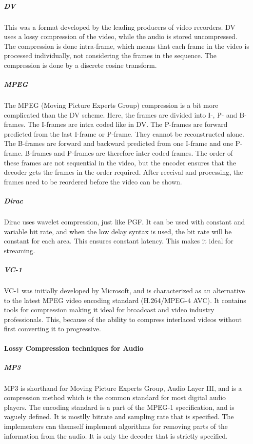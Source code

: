 \subparagraph{DV}
This was a format developed by the leading producers of video recorders. DV uses a lossy compression of the video, while the audio is stored uncompressed. The compression is done intra-frame, which means that each frame in the video is processed individually, not considering the frames in the sequence. The compression is done by a discrete cosine transform.
\cite{bib:DV}


\subparagraph{MPEG}
The MPEG (Moving Picture Experts Group) compression is a bit more complicated than the DV scheme. Here, the frames are divided into I-, P- and B-frames. The I-frames are intra coded like in DV. The P-frames are forward predicted from the last I-frame or P-frame. They cannot be reconstructed alone. The B-frames are forward and backward predicted from one I-frame and one P-frame. B-frames and P-frames are therefore inter coded frames. The order of these frames are not sequential in the video, but the encoder ensures that the decoder gets the frames in the order required. After receival and processing, the frames need to be reordered before the video can be shown.
\cite{bib:MPEG}


\subparagraph{Dirac}
Dirac uses wavelet compression, just like PGF. It can be used with constant and variable bit rate, and when the low delay syntax is used, the bit rate will be constant for each area. This ensures constant latency. This makes it ideal for streaming.
\cite{bib:Dirac}


\subparagraph{VC-1}
VC-1 was initially developed by Microsoft, and is characterized as an alternative to the latest MPEG video encoding standard (H.264/MPEG-4 AVC). It contains tools for compression making it ideal for broadcast and video industry professionals. This, because of the ability to compress interlaced videos without first converting it to progressive.
\cite{bib:VC-1}


\paragraph{Lossy Compression techniques for Audio}


\subparagraph{MP3}
MP3 is shorthand for Moving Picture Experts Group, Audio Layer III, and is a compression method which is the common standard for most digital audio players. The encoding standard is a part of the MPEG-1 specification, and is vaguely defined. It is mostlly bitrate and sampling rate that is specified. The implementers can themself implement algorithms for removing parts of the information from the audio. It is only the decoder that is strictly specified.
\cite{bib:MP3}


